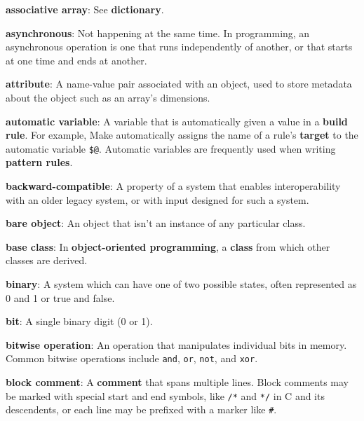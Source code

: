 \documentclass[krantzl]{krantz}
\newcommand{\glosskey}[1]{\textbf{#1}}
\begin{document}
\noindent \textbf{{\newline}\glosskey{associative array}}: 
See \glosskey{dictionary}.


\noindent \textbf{{\newline}\glosskey{asynchronous}}: 
Not happening at the same time. In programming, an asynchronous operation is one that runs independently of another, or that starts at one time and ends at another.


\noindent \textbf{{\newline}\glosskey{attribute}}: 
A name-value pair associated with an object, used to store metadata about the object such as an array’s dimensions.


\noindent \textbf{{\newline}\glosskey{automatic variable}}: 
A variable that is automatically given a value in a \glosskey{build rule}. For example, Make automatically assigns the name of a rule’s \glosskey{target} to the automatic variable \texttt{\$@}. Automatic variables are frequently used when writing \glosskey{pattern rules}.


\noindent \textbf{{\newline}\glosskey{backward-compatible}}: 
A property of a system that enables interoperability with an older legacy system, or with input designed for such a system.


\noindent \textbf{{\newline}\glosskey{bare object}}: 
An object that isn’t an instance of any particular class.


\noindent \textbf{{\newline}\glosskey{base class}}: 
In \glosskey{object-oriented programming}, a \glosskey{class} from which other classes are derived.


\noindent \textbf{{\newline}\glosskey{binary}}: 
A system which can have one of two possible states, often represented as 0 and 1 or true and false.


\noindent \textbf{{\newline}\glosskey{bit}}: 
A single binary digit (0 or 1).


\noindent \textbf{{\newline}\glosskey{bitwise operation}}: 
An operation that manipulates individual bits in memory. Common bitwise operations include \texttt{and}, \texttt{or}, \texttt{not}, and \texttt{xor}.


\noindent \textbf{{\newline}\glosskey{block comment}}: 
A \glosskey{comment} that spans multiple lines. Block comments may be marked with special start and end symbols, like \texttt{/*} and \texttt{*/} in C and its descendents, or each line may be prefixed with a marker like \texttt{\#}.
\end{document}
